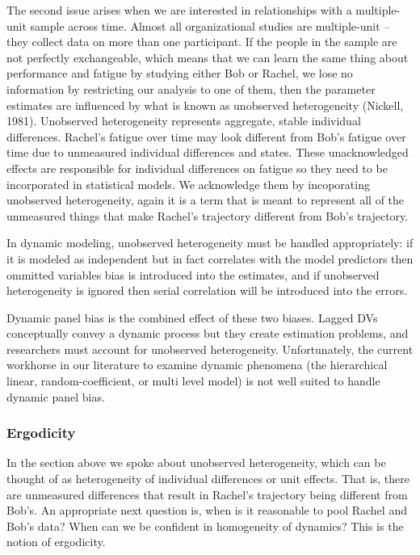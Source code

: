 \documentclass[english,,man]{apa6}
\theoremstyle{definition}
\theoremstyle{definition}
\theoremstyle{definition}
\theoremstyle{remark}
\begin{document}
The second issue arises when we are interested in relationships with a
multiple-unit sample across time. Almost all organizational studies are
multiple-unit -- they collect data on more than one participant. If the
people in the sample are not perfectly exchangeable, which means that we
can learn the same thing about performance and fatigue by studying
either Bob or Rachel, we lose no information by restricting our analysis
to one of them, then the parameter estimates are influenced by what is
known as unobserved heterogeneity (Nickell, 1981). Unobserved
heterogeneity represents aggregate, stable individual differences.
Rachel's fatigue over time may look different from Bob's fatigue over
time due to unmeasured individual differences and states. These
unacknowledged effects are responsible for individual differences on
fatigue so they need to be incorporated in statistical models. We
acknowledge them by incoporating unobserved heterogeneity, again it is a
term that is meant to represent all of the unmeasured things that make
Rachel's trajectory different from Bob's trajectory.

In dynamic modeling, unobserved heterogeneity must be handled
appropriately: if it is modeled as independent but in fact correlates
with the model predictors then ommitted variables bias is introduced
into the estimates, and if unobserved heterogeneity is ignored then
serial correlation will be introduced into the errors.

Dynamic panel bias is the combined effect of these two biases. Lagged
DVs conceptually convey a dynamic process but they create estimation
problems, and researchers must account for unobserved heterogeneity.
Unfortunately, the current workhorse in our literature to examine
dynamic phenomena (the hierarchical linear, random-coefficient, or multi
level model) is not well suited to handle dynamic panel bias.

\hypertarget{ergodicity}{%
\subsubsection{Ergodicity}\label{ergodicity}}

In the section above we spoke about unobserved heterogeneity, which can
be thought of as heterogeneity of individual differences or unit
effects. That is, there are unmeasured differences that result in
Rachel's trajectory being different from Bob's. An appropriate next
question is, when is it reasonable to pool Rachel and Bob's data? When
can we be confident in homogeneity of dynamics? This is the notion of
ergodicity.
\end{document}
